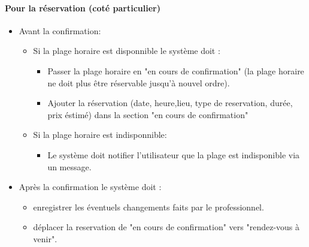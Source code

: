\documentclass{article}
\begin{document}
\paragraph{Pour la réservation (coté particulier)}
\begin{itemize}
\item Avant la confirmation:
	\begin{itemize}
	\item Si la plage horaire est disponnible le système doit :
		\begin{itemize}
		\item Passer la plage horaire en "en cours de confirmation" 
			(la plage horaire ne doit plus être réservable jusqu'à nouvel ordre).
		\item Ajouter la réservation (date, heure,lieu, type de reservation, durée, prix éstimé) dans la section "en cours de confirmation"
		\end{itemize}
	\item Si la plage horaire est indisponnible:
		\begin{itemize}
		\item Le système doit notifier l'utilisateur que la plage est indisponible via un message.
		\end{itemize}
	\end{itemize}
\item Après la confirmation le système doit :
	\begin{itemize}
	\item enregistrer les éventuels changements faits par le professionnel.
	\item déplacer la reservation de "en cours de confirmation" vers "rendez-vous à venir".


	\end{itemize}
\end{itemize}
\end{document}
